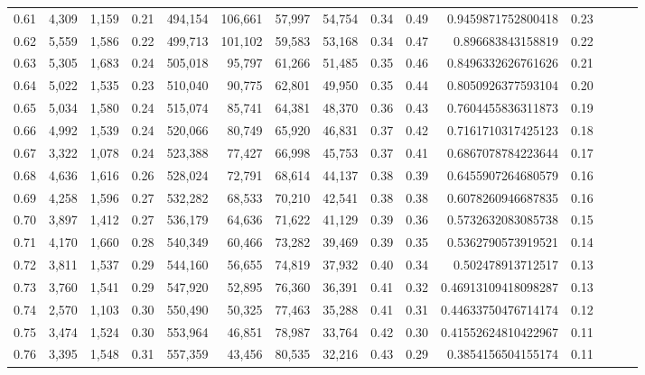 \begin{tabular}{rrrrrrrrrrrrrrr}
0.61 &   4,309 &  1,159 &  0.21 &  494,154 &  106,661 &   57,997 &   54,754 &  0.34 &  0.49 &    0.9459871752800418 &      0.23 \\
0.62 &   5,559 &  1,586 &  0.22 &  499,713 &  101,102 &   59,583 &   53,168 &  0.34 &  0.47 &     0.896683843158819 &      0.22 \\
0.63 &   5,305 &  1,683 &  0.24 &  505,018 &   95,797 &   61,266 &   51,485 &  0.35 &  0.46 &    0.8496332626761626 &      0.21 \\
0.64 &   5,022 &  1,535 &  0.23 &  510,040 &   90,775 &   62,801 &   49,950 &  0.35 &  0.44 &    0.8050926377593104 &      0.20 \\
0.65 &   5,034 &  1,580 &  0.24 &  515,074 &   85,741 &   64,381 &   48,370 &  0.36 &  0.43 &    0.7604455836311873 &      0.19 \\
0.66 &   4,992 &  1,539 &  0.24 &  520,066 &   80,749 &   65,920 &   46,831 &  0.37 &  0.42 &    0.7161710317425123 &      0.18 \\
0.67 &   3,322 &  1,078 &  0.24 &  523,388 &   77,427 &   66,998 &   45,753 &  0.37 &  0.41 &    0.6867078784223644 &      0.17 \\
0.68 &   4,636 &  1,616 &  0.26 &  528,024 &   72,791 &   68,614 &   44,137 &  0.38 &  0.39 &    0.6455907264680579 &      0.16 \\
0.69 &   4,258 &  1,596 &  0.27 &  532,282 &   68,533 &   70,210 &   42,541 &  0.38 &  0.38 &    0.6078260946687835 &      0.16 \\
0.70 &   3,897 &  1,412 &  0.27 &  536,179 &   64,636 &   71,622 &   41,129 &  0.39 &  0.36 &    0.5732632083085738 &      0.15 \\
0.71 &   4,170 &  1,660 &  0.28 &  540,349 &   60,466 &   73,282 &   39,469 &  0.39 &  0.35 &    0.5362790573919521 &      0.14 \\
0.72 &   3,811 &  1,537 &  0.29 &  544,160 &   56,655 &   74,819 &   37,932 &  0.40 &  0.34 &     0.502478913712517 &      0.13 \\
0.73 &   3,760 &  1,541 &  0.29 &  547,920 &   52,895 &   76,360 &   36,391 &  0.41 &  0.32 &   0.46913109418098287 &      0.13 \\
0.74 &   2,570 &  1,103 &  0.30 &  550,490 &   50,325 &   77,463 &   35,288 &  0.41 &  0.31 &   0.44633750476714174 &      0.12 \\
0.75 &   3,474 &  1,524 &  0.30 &  553,964 &   46,851 &   78,987 &   33,764 &  0.42 &  0.30 &   0.41552624810422967 &      0.11 \\
0.76 &   3,395 &  1,548 &  0.31 &  557,359 &   43,456 &   80,535 &   32,216 &  0.43 &  0.29 &    0.3854156504155174 &      0.11 \\

\end{tabular}

